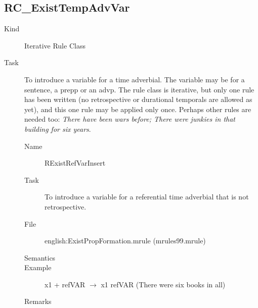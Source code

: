 \subsection{RC\_ExistTempAdvVar}
\begin{description}
\item[Kind] Iterative Rule Class
\item[Task] To introduce a variable for a time adverbial. The variable may be 
for a sentence, a prepp or an advp. The rule class is iterative, but only one 
rule has been written (no retrospective or durational temporals are allowed as 
yet), and this one rule may be applied only once. Perhaps other rules are 
needed too: {\em There have been wars before; There were junkies in that 
building for six years}.

\vspace{1 cm}
\begin{description}
\item[Name] RExistRefVarInsert
\item[Task] To introduce a variable for a referential time adverbial that is 
not retrospective.
\item[File] english:ExistPropFormation.mrule (mrules99.mrule)
\item[Semantics]
\item[Example] x1 + refVAR $\rightarrow$ x1 refVAR (There were six books in 
all)
\item[Remarks]
\end{description}

\end{description}

\newpage
